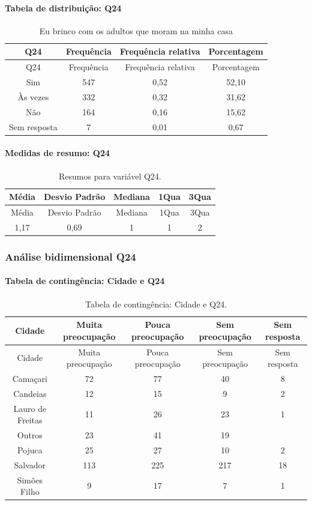 \documentclass[]{article}
\let\oldparagraph\paragraph
\renewcommand{\paragraph}[1]{\oldparagraph{#1}\mbox{}}
\begin{document}
\hypertarget{tabela-de-distribuiuxe7uxe3o-q24}{%
\paragraph{Tabela de distribuição: Q24}\label{tabela-de-distribuiuxe7uxe3o-q24}}

\begin{longtable}[]{@{}cccc@{}}
\caption{\label{tab:unnamed-chunk-601}Eu brinco com os adultos que moram na minha casa}\tabularnewline
\toprule
Q24 & Frequência & Frequência relativa & Porcentagem\tabularnewline
\midrule
\endfirsthead
\toprule
Q24 & Frequência & Frequência relativa & Porcentagem\tabularnewline
\midrule
\endhead
Sim & 547 & 0,52 & 52,10\tabularnewline
Às vezes & 332 & 0,32 & 31,62\tabularnewline
Não & 164 & 0,16 & 15,62\tabularnewline
Sem resposta & 7 & 0,01 & 0,67\tabularnewline
\bottomrule
\end{longtable}

\hypertarget{medidas-de-resumo-q24}{%
\paragraph{Medidas de resumo: Q24}\label{medidas-de-resumo-q24}}

\begin{longtable}[]{@{}ccccc@{}}
\caption{\label{tab:unnamed-chunk-602}Resumos para variável Q24.}\tabularnewline
\toprule
Média & Desvio Padrão & Mediana & 1Qua & 3Qua\tabularnewline
\midrule
\endfirsthead
\toprule
Média & Desvio Padrão & Mediana & 1Qua & 3Qua\tabularnewline
\midrule
\endhead
1,17 & 0,69 & 1 & 1 & 2\tabularnewline
\bottomrule
\end{longtable}

\cleardoublepage

\hypertarget{anuxe1lise-bidimensional-q24}{%
\subsubsection{Análise bidimensional Q24}\label{anuxe1lise-bidimensional-q24}}

\hypertarget{tabela-de-continguxeancia-cidade-e-q24}{%
\paragraph{Tabela de contingência: Cidade e Q24}\label{tabela-de-continguxeancia-cidade-e-q24}}

\begin{longtable}[]{@{}ccccc@{}}
\caption{\label{tab:unnamed-chunk-603}Tabela de contingência: Cidade e Q24.}\tabularnewline
\toprule
Cidade & Muita preocupação & Pouca preocupação & Sem preocupação & Sem resposta\tabularnewline
\midrule
\endfirsthead
\toprule
Cidade & Muita preocupação & Pouca preocupação & Sem preocupação & Sem resposta\tabularnewline
\midrule
\endhead
Camaçari & 72 & 77 & 40 & 8\tabularnewline
Candeias & 12 & 15 & 9 & 2\tabularnewline
Lauro de Freitas & 11 & 26 & 23 & 1\tabularnewline
Outros & 23 & 41 & 19 &\tabularnewline
Pojuca & 25 & 27 & 10 & 2\tabularnewline
Salvador & 113 & 225 & 217 & 18\tabularnewline
Simões Filho & 9 & 17 & 7 & 1\tabularnewline
\bottomrule
\end{longtable}
\end{document}
